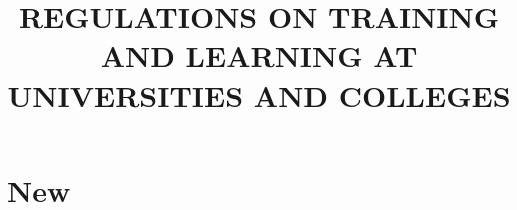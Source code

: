 \documentclass[14pt,a4paper]{article}
\title{REGULATIONS ON TRAINING AND LEARNING AT UNIVERSITIES AND COLLEGES}
\begin{document}
\maketitle
\section{New}
\end{document}
